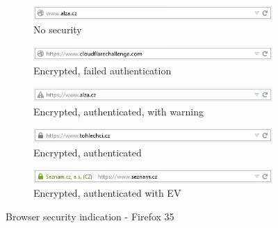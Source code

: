 \begin{figure}
  \begin{subfigure}[b]{\textwidth}
    \centering
    \includegraphics[scale=0.6]{images/browsers/ff-none.png}
    \caption{No security}
  \end{subfigure}
  \begin{subfigure}[b]{\textwidth}
    \centering
    \includegraphics[scale=0.6]{images/browsers/ff-untrusted.png}
    \caption{Encrypted, failed authentication}
  \end{subfigure}
  \begin{subfigure}[b]{\textwidth}
    \centering
    \includegraphics[scale=0.6]{images/browsers/ff-warning.png}
    \caption{Encrypted, authenticated, with warning}
  \end{subfigure}
  \begin{subfigure}[b]{\textwidth}
    \centering
    \includegraphics[scale=0.6]{images/browsers/ff-dv.png}
    \caption{Encrypted, authenticated}
  \end{subfigure}
  \begin{subfigure}[b]{\textwidth}
    \centering
    \includegraphics[scale=0.6]{images/browsers/ff-ev.png}
    \caption{Encrypted, authenticated with EV}
  \end{subfigure}
  \caption{Browser security indication - Firefox 35}
\end{figure}

